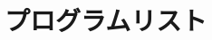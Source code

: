 \clearpage
\appendix
\renewcommand{\thesection}{付録\Alph{section}}
\addtolength{\cftsecnumwidth}{1em}

\section{プログラムリスト}



